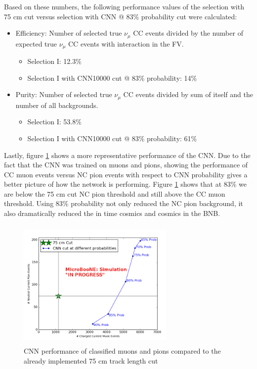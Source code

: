 Based on these numbers, the following performance values of the selection with 75 cm cut versus selection with CNN @ 83\% probability cut were calculated:
\begin{itemize}
\item Efficiency: Number of selected true $\nu_{\mu}$ CC events divided by the number of expected true $\nu_{\mu}$ CC events with interaction in the FV.
\begin{itemize}
\item Selection I: 12.3\% 
\item Selection I with CNN10000 cut @ 83\% probability: 14\% 
\end{itemize}
\item Purity: Number of selected true $\nu_{\mu}$ CC events divided by sum of itself and the number of all backgrounds.
\begin{itemize}
\item Selection I: 53.8\% 
\item Selection I with CNN10000 cut @ 83\% probability: 61\% 
\end{itemize}
\end{itemize}

Lastly, figure \ref{fig:sel1mod_cnnperformance} shows a more representative performance of the CNN. Due to the fact that the CNN was trained on muons and pions, showing the performance of CC muon events versus NC pion events with respect to CNN probability gives a better picture of how the network is performing. Figure \ref{fig:sel1mod_cnnperformance} shows that at 83\% we are below the 75 cm cut NC pion threshold and still above the CC muon threshold. Using 83\% probability not only reduced the NC pion background, it also dramatically reduced the in time cosmics and cosmics in the BNB. 

\begin{figure}[htp!]
\centering
\includegraphics[width=3in,height=2.5in]{figs/cnn_performance.png}
\caption{CNN performance of classified muons and pions compared to the already implemented 75 cm track length cut}
\label{fig:sel1mod_cnnperformance}
\end{figure}

